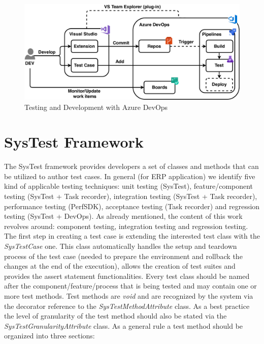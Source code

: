 \begin{figure}[ht]
	\centering
	\includegraphics[scale=0.55]{Images/DevOpsTesting.pdf}
	\caption{Testing and Development with Azure DevOps}
	\label{fig:devOpsTesting}
\end{figure}

\section{SysTest Framework} 

The SysTest framework provides developers a set of classes and methods that can be utilized to author test cases. In general (for ERP application) we identify five kind of applicable testing techniques: unit testing (SysTest), feature/component testing (SysTest + Task recorder), integration testing (SysTest + Task recorder), performance testing (PerfSDK), acceptance testing (Task recorder) and regression testing (SysTest + DevOps).  As already mentioned, the content of this work revolves around: component testing, integration testing and regression testing. The first step in creating a test case is extending the interested test class with the \textit{SysTestCase} one. This class automatically handles the setup and teardown process of the test case (needed to prepare the environment and rollback the changes at the end of the execution), allows the creation of test suites and provides the assert statement functionalities.   Every test class should be named after the component/feature/process that is being tested and may contain one or more test methods. Test methods are \textit{void} and are recognized by the system via the decorator reference to the \textit{SysTestMethodAttribute} class. As a best practice the level of granularity of the test method should also be stated via the \textit{SysTestGranularityAttribute} class. As a general rule a test method should be organized into three sections:

